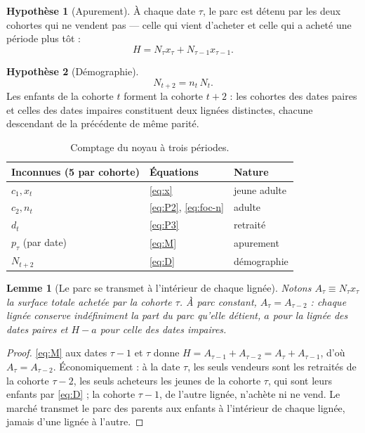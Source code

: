 \documentclass[11pt,a4paper]{article}
\theoremstyle{plain}
\newtheorem{lemme}{Lemme}
\theoremstyle{definition}
\newtheorem{hypothese}{Hypothèse}
\begin{document}
\begin{hypothese}[Apurement]
À chaque date $\tau$, le parc est détenu par les deux cohortes qui ne vendent pas — celle qui vient d'acheter et celle qui a acheté une période plus tôt :
\begin{equation}\label{eq:M}
H = N_\tau x_\tau + N_{\tau-1} x_{\tau-1} .
\end{equation}
\end{hypothese}
\begin{hypothese}[Démographie]
\begin{equation}\label{eq:D}
N_{t+2} = n_t\, N_t .
\end{equation}
Les enfants de la cohorte $t$ forment la cohorte $t+2$ : les cohortes des dates paires et celles des dates impaires constituent deux lignées distinctes, chacune descendant de la précédente de même parité.
\end{hypothese}

\begin{table}[htbp]
\centering\small
\begin{tabular}{@{}lll@{}}
\toprule
Inconnues (5 par cohorte) & Équations & Nature \\
\midrule
$c_1, x_t$ & \eqref{eq:x} & jeune adulte \\
$c_2, n_t$ & \eqref{eq:P2}, \eqref{eq:foc-n} & adulte \\
$d_t$ & \eqref{eq:P3} & retraité \\
$p_\tau$ (par date) & \eqref{eq:M} & apurement \\
$N_{t+2}$ & \eqref{eq:D} & démographie \\
\bottomrule
\end{tabular}
\caption{Comptage du noyau à trois périodes.}
\end{table}

\begin{lemme}[Le parc se transmet à l'intérieur de chaque lignée]\label{lem:conservation}
Notons $A_\tau \equiv N_\tau x_\tau$ la surface totale achetée par la cohorte $\tau$. À parc constant, $A_\tau = A_{\tau-2}$ : chaque lignée conserve indéfiniment la part du parc qu'elle détient, $a$ pour la lignée des dates paires et $H-a$ pour celle des dates impaires.
\end{lemme}
\begin{proof}
\eqref{eq:M} aux dates $\tau-1$ et $\tau$ donne $H = A_{\tau-1} + A_{\tau-2} = A_\tau + A_{\tau-1}$, d'où $A_\tau = A_{\tau-2}$. Économiquement : à la date $\tau$, les seuls vendeurs sont les retraités de la cohorte $\tau-2$, les seuls acheteurs les jeunes de la cohorte $\tau$, qui sont leurs enfants par \eqref{eq:D} ; la cohorte $\tau-1$, de l'autre lignée, n'achète ni ne vend. Le marché transmet le parc des parents aux enfants à l'intérieur de chaque lignée, jamais d'une lignée à l'autre.
\end{proof}
\end{document}
